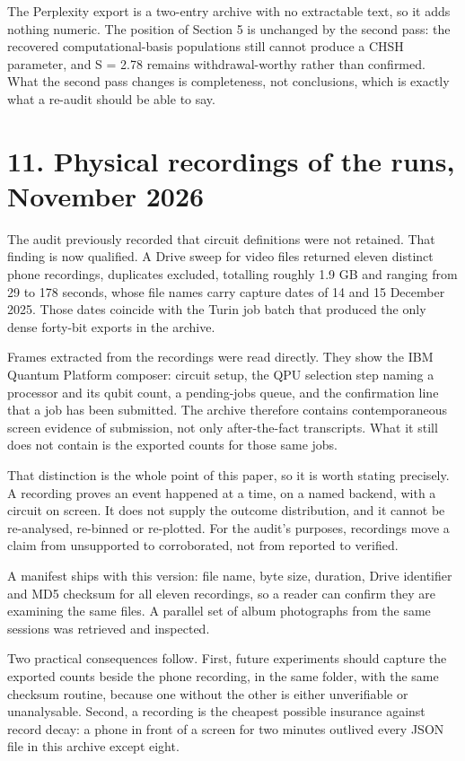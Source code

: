 \documentclass[11pt]{article}
\begin{document}
The Perplexity export is a two-entry archive with no extractable text, so it adds nothing numeric. The position of Section 5 is unchanged by the second pass: the recovered computational-basis populations still cannot produce a CHSH parameter, and S = 2.78 remains withdrawal-worthy rather than confirmed. What the second pass changes is completeness, not conclusions, which is exactly what a re-audit should be able to say.

\section*{11. Physical recordings of the runs, November 2026}

The audit previously recorded that circuit definitions were not retained. That finding is now qualified. A Drive sweep for video files returned eleven distinct phone recordings, duplicates excluded, totalling roughly 1.9 GB and ranging from 29 to 178 seconds, whose file names carry capture dates of 14 and 15 December 2025. Those dates coincide with the Turin job batch that produced the only dense forty-bit exports in the archive.

Frames extracted from the recordings were read directly. They show the IBM Quantum Platform composer: circuit setup, the QPU selection step naming a processor and its qubit count, a pending-jobs queue, and the confirmation line that a job has been submitted. The archive therefore contains contemporaneous screen evidence of submission, not only after-the-fact transcripts. What it still does not contain is the exported counts for those same jobs.

That distinction is the whole point of this paper, so it is worth stating precisely. A recording proves an event happened at a time, on a named backend, with a circuit on screen. It does not supply the outcome distribution, and it cannot be re-analysed, re-binned or re-plotted. For the audit's purposes, recordings move a claim from unsupported to corroborated, not from reported to verified.

A manifest ships with this version: file name, byte size, duration, Drive identifier and MD5 checksum for all eleven recordings, so a reader can confirm they are examining the same files. A parallel set of album photographs from the same sessions was retrieved and inspected.

Two practical consequences follow. First, future experiments should capture the exported counts beside the phone recording, in the same folder, with the same checksum routine, because one without the other is either unverifiable or unanalysable. Second, a recording is the cheapest possible insurance against record decay: a phone in front of a screen for two minutes outlived every JSON file in this archive except eight.
\end{document}

